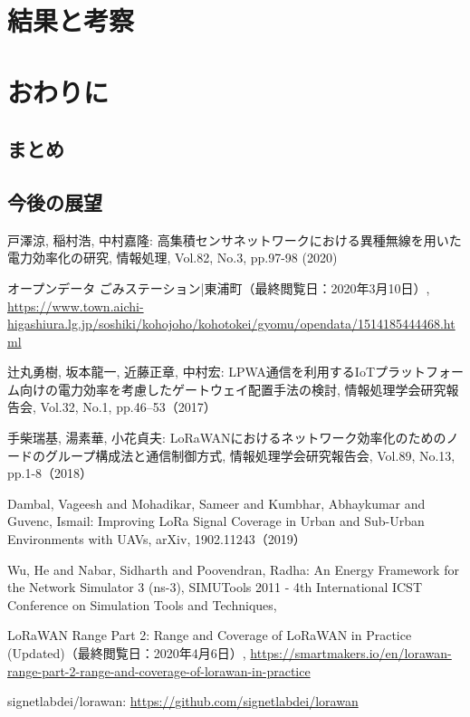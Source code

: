 \documentclass[Japanese]{dicomopapers}
\begin{document}
\section{結果と考察}
\section{おわりに}
\subsection{まとめ}
\subsection{今後の展望}

\begin{thebibliography}{4}
     戸澤涼, 稲村浩, 中村嘉隆:  高集積センサネットワークにおける異種無線を用いた電力効率化の研究, 情報処理, Vol.82, No.3, pp.97-98 (2020)
    
     オープンデータ ごみステーション|東浦町（最終閲覧日：2020年3月10日）, \url{https://www.town.aichi-higashiura.lg.jp/soshiki/kohojoho/kohotokei/gyomu/opendata/1514185444468.html}

     辻丸勇樹, 坂本龍一, 近藤正章, 中村宏: LPWA通信を利用するIoTプラットフォーム向けの電力効率を考慮したゲートウェイ配置手法の検討, 情報処理学会研究報告会, Vol.32, No.1, pp.46–53（2017）

     手柴瑞基, 湯素華, 小花貞夫: LoRaWANにおけるネットワーク効率化のためのノードのグループ構成法と通信制御方式, 情報処理学会研究報告会, Vol.89, No.13, pp.1-8（2018）

     Dambal, Vageesh and Mohadikar, Sameer and Kumbhar, Abhaykumar and Guvenc, Ismail: Improving LoRa Signal Coverage in Urban and Sub-Urban Environments with UAVs, arXiv, 1902.11243（2019）

     Wu, He and Nabar, Sidharth and Poovendran, Radha: An Energy Framework for the Network Simulator 3 (ns-3), SIMUTools 2011 - 4th International ICST Conference on Simulation Tools and Techniques, 

     LoRaWAN Range Part 2: Range and Coverage of LoRaWAN in Practice (Updated)（最終閲覧日：2020年4月6日）, \url{https://smartmakers.io/en/lorawan-range-part-2-range-and-coverage-of-lorawan-in-practice}

     signetlabdei/lorawan: \url{https://github.com/signetlabdei/lorawan}


\end{thebibliography}
\end{document}
